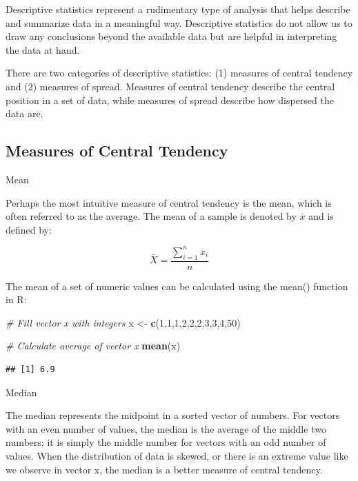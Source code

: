 \documentclass[]{book}
\newenvironment{Shaded}{\begin{snugshade}}{\end{snugshade}}
\newcommand{\CommentTok}[1]{\textcolor[rgb]{0.56,0.35,0.01}{\textit{#1}}}
\newcommand{\DecValTok}[1]{\textcolor[rgb]{0.00,0.00,0.81}{#1}}
\newcommand{\KeywordTok}[1]{\textcolor[rgb]{0.13,0.29,0.53}{\textbf{#1}}}
\newcommand{\NormalTok}[1]{#1}
\newcommand{\StringTok}[1]{\textcolor[rgb]{0.31,0.60,0.02}{#1}}
\begin{document}
Descriptive statistics represent a rudimentary type of analysis that helps describe and summarize data in a meaningful way. Descriptive statistics do not allow us to draw any conclusions beyond the available data but are helpful in interpreting the data at hand.

There are two categories of descriptive statistics: (1) measures of central tendency and (2) measures of spread. Measures of central tendency describe the central position in a set of data, while measures of spread describe how dispersed the data are.

\hypertarget{measures-of-central-tendency}{%
\subsection{Measures of Central Tendency}\label{measures-of-central-tendency}}

Mean

Perhaps the most intuitive measure of central tendency is the mean, which is often referred to as the average. The mean of a sample is denoted by \(\bar{x}\) and is defined by:

\[ \bar{X} = \frac{\sum_{i=1}^{n} x_{i}}{n} \]

The mean of a set of numeric values can be calculated using the mean() function in R:

\begin{Shaded}
\begin{Highlighting}[]
\CommentTok{# Fill vector x with integers}
\NormalTok{x <-}\StringTok{ }\KeywordTok{c}\NormalTok{(}\DecValTok{1}\NormalTok{,}\DecValTok{1}\NormalTok{,}\DecValTok{1}\NormalTok{,}\DecValTok{2}\NormalTok{,}\DecValTok{2}\NormalTok{,}\DecValTok{2}\NormalTok{,}\DecValTok{3}\NormalTok{,}\DecValTok{3}\NormalTok{,}\DecValTok{4}\NormalTok{,}\DecValTok{50}\NormalTok{)}

\CommentTok{# Calculate average of vector x}
\KeywordTok{mean}\NormalTok{(x)}
\end{Highlighting}
\end{Shaded}

\begin{verbatim}
## [1] 6.9
\end{verbatim}

Median

The median represents the midpoint in a sorted vector of numbers. For vectors with an even number of values, the median is the average of the middle two numbers; it is simply the middle number for vectors with an odd number of values. When the distribution of data is skewed, or there is an extreme value like we observe in vector x, the median is a better measure of central tendency.
\end{document}
